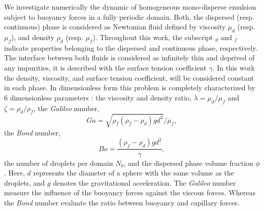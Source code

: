 

We investigate numerically the dynamic of homogeneous mono-disperse emulsion subject to buoyancy forces in a fully periodic domain. 
Both, the dispersed (resp. continuous) phase is considered as Newtonian fluid defined by viscosity $\mu_d$ (resp. $\mu_f$), and density $\rho_d$ (resp. $\mu_f$).
Throughout this work, the subscript $_d$ and $_f$ indicate properties belonging to the dispersed and continuous phase, respectively. 
The interface between both fluids is considered as infinitely thin and deprived of any impurities, it is described with the surface tension coefficient $\gamma$. 
In this work the density, viscosity, and surface tension coefficient, will be considered constant in each phase.
In dimensionless form this problem is completely characterized by $6$ dimensionless parameters :  the viscosity and density ratio, $\lambda = \mu_d / \mu_f$ and $\zeta = \rho_d / \rho_f$,  
the \textit{Galileo} number, 
\begin{equation*}
    Ga =\sqrt{\rho_f(\rho_f - \rho_d) g d^3} / \mu_f,
\end{equation*}
the \textit{Bond} number, 
\begin{equation*}
    Bo =\frac{(\rho_f - \rho_d) g d^2}{\gamma},
\end{equation*}
the number of droplets per domain $N_b$, and the dispersed phase volume fraction $\phi$. 
Here, $d$ represents the diameter of a sphere with the same volume as the droplets, and $g$ denotes the gravitational acceleration.
The \textit{Galileo} number measure the influence of the buoyancy forces against the viscous forces.
Whereas the \textit{Bond} number evaluate the ratio between buoyancy and capillary forces. 


